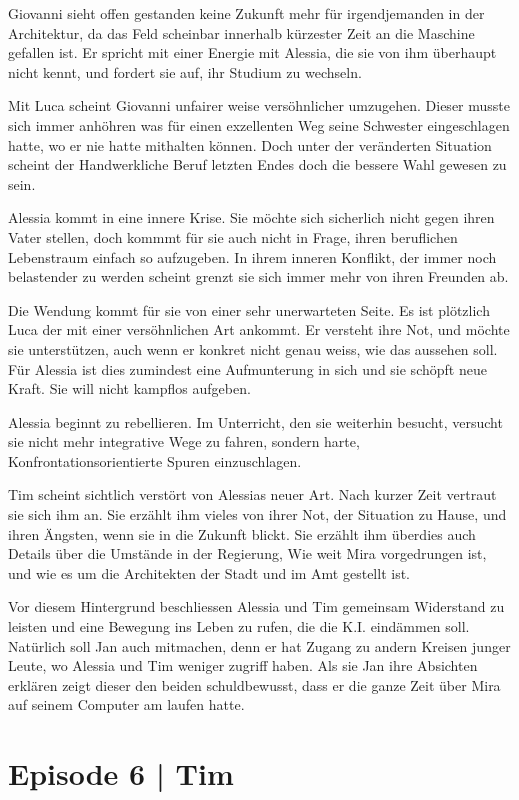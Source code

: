\documentclass[11pt,a4paper,ngerman]{scrreprt}
\begin{document}
Giovanni sieht offen gestanden keine Zukunft mehr für irgendjemanden in der
Architektur, da das Feld scheinbar innerhalb kürzester Zeit an die Maschine
gefallen ist. Er spricht mit einer Energie mit Alessia, die sie von ihm
überhaupt nicht kennt, und fordert sie auf, ihr Studium zu wechseln.

Mit Luca scheint Giovanni unfairer weise versöhnlicher umzugehen. Dieser musste
sich immer anhöhren was für einen exzellenten Weg seine Schwester eingeschlagen
hatte, wo er nie hatte mithalten können. Doch unter der veränderten Situation
scheint der Handwerkliche Beruf letzten Endes doch die bessere Wahl gewesen zu
sein.

Alessia kommt in eine innere Krise. Sie möchte sich sicherlich nicht gegen ihren
Vater stellen, doch kommmt für sie auch nicht in Frage, ihren beruflichen
Lebenstraum einfach so aufzugeben. In ihrem inneren Konflikt, der immer noch
belastender zu werden scheint grenzt sie sich immer mehr von ihren Freunden ab.

Die Wendung kommt für sie von einer sehr unerwarteten Seite. Es ist plötzlich
Luca der mit einer versöhnlichen Art ankommt. Er versteht ihre Not, und möchte
sie unterstützen, auch wenn er konkret nicht genau weiss, wie das aussehen
soll. Für Alessia ist dies zumindest eine Aufmunterung in sich und sie schöpft
neue Kraft. Sie will nicht kampflos aufgeben.

Alessia beginnt zu rebellieren. Im Unterricht, den sie weiterhin besucht,
versucht sie nicht mehr integrative Wege zu fahren, sondern harte,
Konfrontationsorientierte Spuren einzuschlagen.

Tim scheint sichtlich verstört von Alessias neuer Art. Nach kurzer Zeit vertraut
sie sich ihm an. Sie erzählt ihm vieles von ihrer Not, der Situation zu Hause,
und ihren Ängsten, wenn sie in die Zukunft blickt. Sie erzählt ihm überdies auch
Details über die Umstände in der Regierung, Wie weit Mira vorgedrungen ist, und
wie es um die Architekten der Stadt und im Amt gestellt ist.

Vor diesem Hintergrund beschliessen Alessia und Tim gemeinsam Widerstand zu
leisten und eine Bewegung ins Leben zu rufen, die die K.I. eindämmen
soll. Natürlich soll Jan auch mitmachen, denn er hat Zugang zu andern Kreisen
junger Leute, wo Alessia und Tim weniger zugriff haben. Als sie Jan ihre
Absichten erklären zeigt dieser den beiden schuldbewusst, dass er die ganze Zeit
über Mira auf seinem Computer am laufen hatte.

\section*{Episode 6 | Tim}
\end{document}
